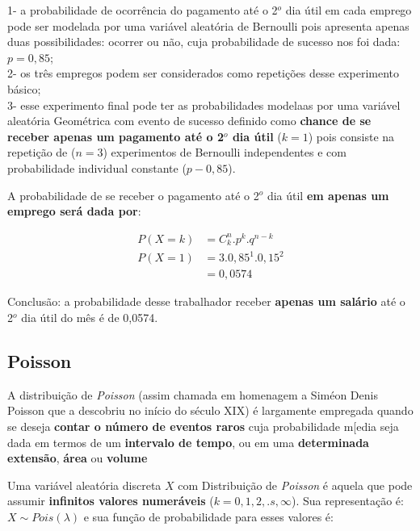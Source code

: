 \documentclass[
]{book}
\begin{document}
\hfill\break

1- a probabilidade de ocorrência do pagamento até o 2\(^{o}\) dia útil em cada emprego pode ser modelada por uma variável aleatória de Bernoulli pois apresenta apenas duas possibilidades: ocorrer ou não, cuja probabilidade de sucesso nos foi dada: \(p=0,85\);\\
2- os três empregos podem ser considerados como repetições desse experimento básico;\\
3- esse experimento final pode ter as probabilidades modelaas por uma variável aleatória Geométrica com evento de sucesso definido como \textbf{chance de se receber apenas um pagamento até o 2\(^{o}\) dia útil} (\(k=1\)) pois consiste na repetição de (\(n=3\)) experimentos de Bernoulli independentes e com probabilidade individual constante (\(p-0,85\)).

\hfill\break

A probabilidade de se receber o pagamento até o 2\(^{o}\) dia útil \textbf{em apenas um emprego será dada por}:

\hfill\break

\begin{align*}
P\left(X=k\right) & ={C}_{k}^{n}. {p}^{k}. {q}^{n-k} \\
P\left(X=1\right) & =3 . 0,85^{1} . 0,15^{2} \\
                  & = 0,0574
\end{align*}

\hfill\break

Conclusão: a probabilidade desse trabalhador receber \textbf{apenas um salário} até o 2\(^{o}\) dia útil do mês é de 0,0574.

\hypertarget{poisson}{%
\subsection{Poisson}\label{poisson}}

A distribuição de \emph{Poisson} (assim chamada em homenagem a Siméon Denis Poisson que a descobriu no início do século XIX) é largamente empregada quando se deseja \textbf{contar o número de eventos raros} cuja probabilidade m{[}edia seja dada em termos de um \textbf{intervalo de tempo}, ou em uma \textbf{determinada extensão}, \textbf{área} ou \textbf{volume}

\hfill\break

Uma variável aleatória discreta \(X\) com Distribuição de \emph{Poisson} é aquela que pode assumir \textbf{infinitos valores numeráveis} (\(k=0,1,2, .s, \infty\)). Sua representação é: \(X \sim Pois (\lambda)\) e sua função de probabilidade para esses valores é:
\end{document}
